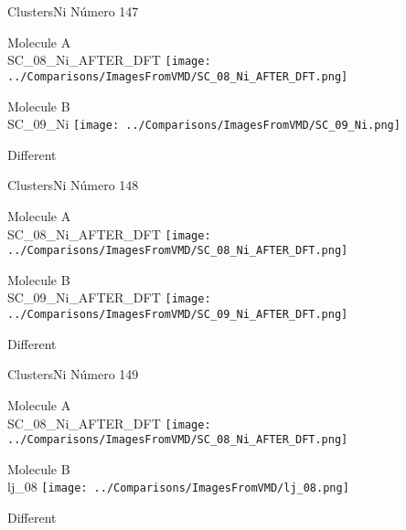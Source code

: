  \newpage

\vtab[-3cm]
\begin{center}
{\large ClustersNi \tab Número 147}
\end{center}
\begin{multicols}{2}
\begin{center}
Molecule A \\ 
SC\_08\_Ni\_AFTER\_DFT
\texttt{[image: ../Comparisons/ImagesFromVMD/SC\_08\_Ni\_AFTER\_DFT.png]}
\\
\vtab

\columnbreak
Molecule B \\ 
SC\_09\_Ni
\texttt{[image: ../Comparisons/ImagesFromVMD/SC\_09\_Ni.png]}
\\
\vtab


\end{center}
\end{multicols}
\begin{center}
\textcolor{NavyBlue}{\Large Different}
\end{center}

 \newpage

\vtab[-3cm]
\begin{center}
{\large ClustersNi \tab Número 148}
\end{center}
\begin{multicols}{2}
\begin{center}
Molecule A \\ 
SC\_08\_Ni\_AFTER\_DFT
\texttt{[image: ../Comparisons/ImagesFromVMD/SC\_08\_Ni\_AFTER\_DFT.png]}
\\
\vtab

\columnbreak
Molecule B \\ 
SC\_09\_Ni\_AFTER\_DFT
\texttt{[image: ../Comparisons/ImagesFromVMD/SC\_09\_Ni\_AFTER\_DFT.png]}
\\
\vtab


\end{center}
\end{multicols}
\begin{center}
\textcolor{NavyBlue}{\Large Different}
\end{center}

 \newpage

\vtab[-3cm]
\begin{center}
{\large ClustersNi \tab Número 149}
\end{center}
\begin{multicols}{2}
\begin{center}
Molecule A \\ 
SC\_08\_Ni\_AFTER\_DFT
\texttt{[image: ../Comparisons/ImagesFromVMD/SC\_08\_Ni\_AFTER\_DFT.png]}
\\
\vtab

\columnbreak
Molecule B \\ 
lj\_08
\texttt{[image: ../Comparisons/ImagesFromVMD/lj\_08.png]}
\\
\vtab


\end{center}
\end{multicols}
\begin{center}
\textcolor{NavyBlue}{\Large Different}
\end{center}

